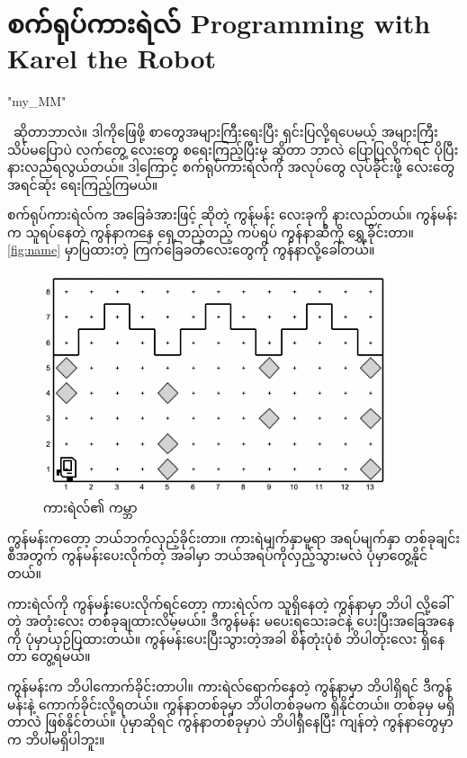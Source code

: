\chapter{စက်ရုပ်ကားရဲလ်  Programming with Karel the Robot}
\XeTeXlinebreaklocale "my_MM"  %
\begin{sloppypar}
\enprog\ ဆိုတာဘာလဲ။ ဒါကိုဖြေဖို့ စာတွေအများကြီးရေးပြီး ရှင်းပြလို့ရပေမယ့် အများကြီးသိပ်မပြောပဲ လက်တွေ့ \enprogram လေးတွေ စရေးကြည့်ပြီးမှ \mmprogramming ဆိုတာ ဘာလဲ ပြောပြလိုက်ရင် ပိုပြီးနားလည်ရလွယ်တယ်။ ဒါ့ကြောင့် စက်ရုပ်ကားရဲလ်ကို အလုပ်တွေ လုပ်ခိုင်းဖို့ \mmprogram လေးတွေ  အရင်ဆုံး ရေးကြည့်ကြမယ်။

စက်ရုပ်ကားရဲလ်က အခြေခံအားဖြင့်  ဆိုတဲ့ ကွန်မန်း လေးခုကို နားလည်တယ်။  ကွန်မန်းက သူရပ်နေတဲ့ ကွန်နာကနေ ရှေ့တည့်တည့် ကပ်ရပ် ကွန်နာဆီကို ရွှေ့ခိုင်းတာ။ \Fig \vref*{fig:name} မှာပြထားတဲ့ ကြက်ခြေခတ်လေးတွေကို ကွန်နာလို့ခေါ်တယ်။ 

\begin{figure}[!b]
    \centering\caption{ကားရဲလ်၏ {} ကမ္ဘာ}\label{fig:name}
    \includegraphics[width=4in]{ch01/ch01}
\end{figure}


 ကွန်မန်းကတော့ ဘယ်ဘက်လှည့်ခိုင်းတာ။ ကားရဲမျက်နှာမူရာ အရပ်မျက်နှာ တစ်ခုချင်းစီအတွက်  ကွန်မန်းပေးလိုက်တဲ့ အခါမှာ ဘယ်အရပ်ကိုလှည့်သွားမလဲ ပုံမှာတွေ့နိုင်တယ်။

ကားရဲလ်ကို  ကွန်မန်းပေးလိုက်ရင်တော့ ကားရဲလ်က သူရှိနေတဲ့ ကွန်နာမှာ ဘိပါ လို့ခေါ်တဲ့ အတုံးလေး တစ်ခုချထားလိမ့်မယ်။ ဒီကွန်မန်း မပေးရသေးခင်နဲ့ ပေးပြီးအခြေအနေကို ပုံမှာယှဉ်ပြထားတယ်။ ကွန်မန်းပေးပြီးသွားတဲ့အခါ စိန်တုံးပုံစံ ဘိပါတုံးလေး ရှိနေတာ တွေ့ရမယ်။ 

 ကွန်မန်းက ဘိပါကောက်ခိုင်းတာပါ။ ကားရဲလ်ရောက်နေတဲ့ ကွန်နာမှာ ဘိပါရှိရင် ဒီကွန်မန်းနဲ့ ကောက်ခိုင်းလို့ရတယ်။ ကွန်နာတစ်ခုမှာ ဘိပါတစ်ခုမက ရှိနိုင်တယ်။ တစ်ခုမှ မရှိတာလဲ ဖြစ်နိုင်တယ်။ ပုံမှာဆိုရင် ကွန်နာတစ်ခုမှာပဲ ဘိပါရှိနေပြီး ကျန်တဲ့ ကွန်နာတွေမှာက ဘိပါမရှိပါဘူး။


\end{sloppypar}
